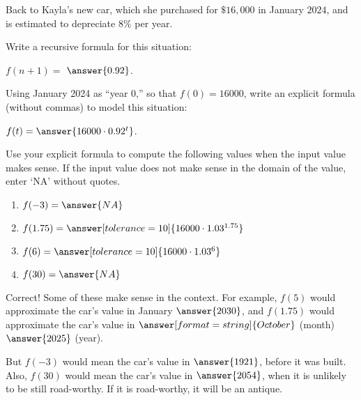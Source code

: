 \documentclass[nooutcomes]{ximera}
\begin{document}
\begin{problem}
Back to Kayla's new car, which she purchased for $\$16,\!000$ in January $2024$, and is estimated to depreciate $8\%$ per year.  

Write a recursive formula for this situation:  

\begin{prompt}
$f(n+1) =$ 
\wordChoice{\choice{$+$}\choice{$-$}\choice[correct]{$\times$}\choice{$\div$}\choice{$\wedge$}}$\answer{0.92}$.
\end{prompt}
\begin{problem}
Using January 2024 as ``year 0,'' so that $f(0)=16000$,  write an explicit formula (without commas) to model this situation: 
\begin{prompt}
$f(t) = \answer{16000\cdot 0.92^t}$.
\end{prompt}

\begin{problem}
Use your explicit formula to compute the following values when the input value makes sense.  If the input value does not make sense in the domain of the value, enter `NA' without quotes.
\begin{enumerate}
\item $f(-3) = \answer{NA}$
\item $f(1.75) = \answer[tolerance=10]{16000\cdot 1.03^{1.75}}$
\item $f(6) = \answer[tolerance=10]{16000\cdot 1.03^6}$
\item $f(30) = \answer{NA}$
\end{enumerate}
\begin{problem}
Correct!  Some of these make sense in the context.  For example, $f(5)$ would approximate the car's value in January $\answer{2030}$, and $f(1.75)$ would approximate the car's value in $\answer[format=string]{October}$ (month) $\answer{2025}$ (year).  

But $f(-3)$ would mean the car's value in $\answer{1921}$, before it was built.  Also, $f(30)$ would mean the car's value in $\answer{2054}$, when it is unlikely to be still road-worthy.  If it is road-worthy, it will be an antique.    

\end{problem}

\end{problem}
\end{problem}
\end{problem}
\end{document}
